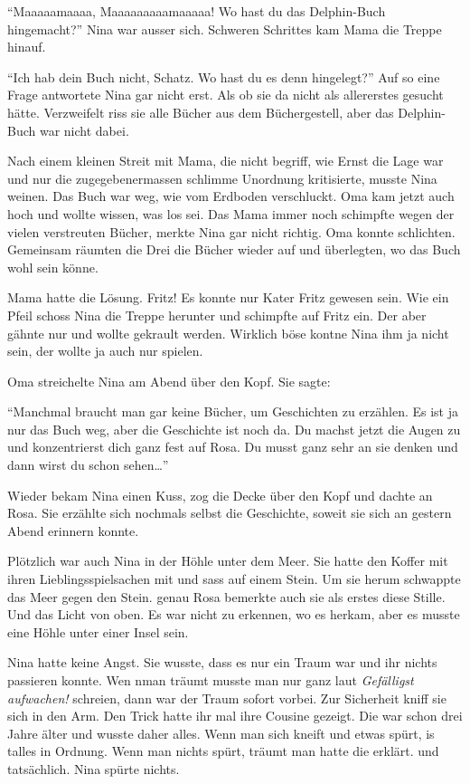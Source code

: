 \begin{mdframed}[style=mystyle]
\enquote{Maaaaamaaaa, Maaaaaaaaamaaaaa! Wo hast du das Delphin-Buch hingemacht?} Nina war ausser sich. Schweren Schrittes kam Mama die Treppe hinauf.

\enquote{Ich hab dein Buch nicht, Schatz. Wo hast du es denn hingelegt?} Auf so eine Frage antwortete Nina gar nicht erst. Als ob sie da nicht als allererstes gesucht hätte. Verzweifelt riss sie alle Bücher aus dem Büchergestell, aber das Delphin-Buch war nicht dabei.

Nach einem kleinen Streit mit Mama, die nicht begriff, wie Ernst die Lage war und nur die zugegebenermassen schlimme Unordnung kritisierte, musste Nina weinen. Das Buch war weg, wie vom Erdboden verschluckt. Oma kam jetzt auch hoch und wollte wissen, was los sei. Das Mama immer noch schimpfte wegen der vielen verstreuten Bücher, merkte Nina gar nicht richtig. Oma konnte schlichten. Gemeinsam räumten die Drei die Bücher wieder auf und überlegten, wo das Buch wohl sein könne.

Mama hatte die Lösung. Fritz! Es konnte nur Kater Fritz gewesen sein. Wie ein Pfeil schoss Nina die Treppe herunter und schimpfte auf Fritz ein. Der aber gähnte nur und wollte gekrault werden. Wirklich böse kontne Nina ihm ja nicht sein, der wollte ja auch nur spielen.

Oma streichelte Nina am Abend über den Kopf. Sie sagte:

\enquote{Manchmal braucht man gar keine Bücher, um Geschichten zu erzählen. Es ist ja nur das Buch weg, aber die Geschichte ist noch da. Du machst jetzt die Augen zu und konzentrierst dich ganz fest auf Rosa. Du musst ganz sehr an sie denken und dann wirst du schon sehen\dots}

Wieder bekam Nina einen Kuss, zog die Decke über den Kopf und dachte an Rosa. Sie erzählte sich nochmals selbst die Geschichte, soweit sie sich an gestern Abend erinnern konnte.
\end{mdframed}\medskip

Plötzlich war auch Nina in der Höhle unter dem Meer. Sie hatte den Koffer mit ihren Lieblingsspielsachen mit und sass auf einem Stein. Um sie herum schwappte das Meer gegen den Stein. genau Rosa bemerkte auch sie als erstes diese Stille. Und das Licht von oben. Es war nicht zu erkennen, wo es herkam, aber es musste eine Höhle unter einer Insel sein.

Nina hatte keine Angst. Sie wusste, dass es nur ein Traum war und ihr nichts passieren konnte. Wen nman träumt musste man nur ganz laut {\it Gefälligst aufwachen!} schreien, dann war der Traum sofort vorbei. Zur Sicherheit kniff sie sich in den Arm. Den Trick hatte ihr mal ihre Cousine gezeigt. Die war schon drei Jahre älter und wusste daher alles. Wenn man sich kneift und etwas spürt, is talles in Ordnung. Wenn man nichts spürt, träumt man hatte die erklärt. und tatsächlich. Nina spürte nichts.



